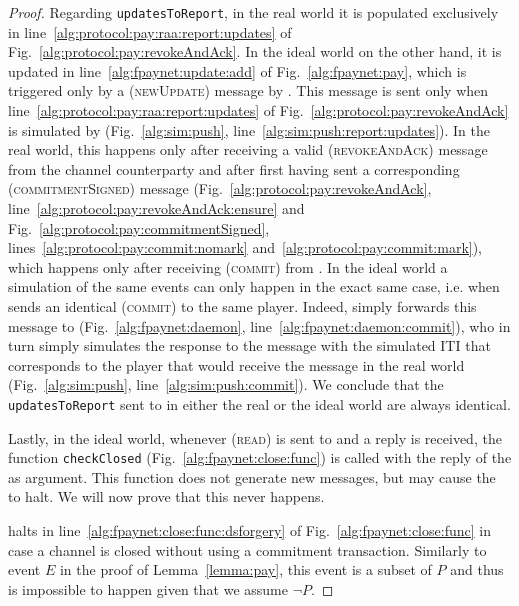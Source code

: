 \begin{proof}
  Regarding \texttt{updatesToReport}, in the real world it is populated
  exclusively in line~\ref{alg:protocol:pay:raa:report:updates} of
  Fig.~\ref{alg:protocol:pay:revokeAndAck}. In the ideal world on the other
  hand, it is updated in line~\ref{alg:fpaynet:update:add} of
  Fig.~\ref{alg:fpaynet:pay}, which is triggered only by a (\textsc{newUpdate})
  message by \simulator. This message is sent only when
  line~\ref{alg:protocol:pay:raa:report:updates} of
  Fig.~\ref{alg:protocol:pay:revokeAndAck} is simulated by \simulator{}
  (Fig.~\ref{alg:sim:push}, line~\ref{alg:sim:push:report:updates}). In the real
  world, this happens only after receiving a valid (\textsc{revokeAndAck})
  message from the channel counterparty and after first having sent a
  corresponding (\textsc{commitmentSigned}) message
  (Fig.~\ref{alg:protocol:pay:revokeAndAck},
  line~\ref{alg:protocol:pay:revokeAndAck:ensure} and
  Fig.~\ref{alg:protocol:pay:commitmentSigned},
  lines~\ref{alg:protocol:pay:commit:nomark}
  and~\ref{alg:protocol:pay:commit:mark}), which happens only after receiving
  (\textsc{commit}) from \environment. In the ideal world a simulation of the
  same events can only happen in the exact same case, i.e. when \environment{}
  sends an identical (\textsc{commit}) to the same player. Indeed, \fpaynet{}
  simply forwards this message to \simulator{} (Fig.~\ref{alg:fpaynet:daemon},
  line~\ref{alg:fpaynet:daemon:commit}), who in turn simply simulates the
  response to the message with the simulated ITI that corresponds to the player
  that would receive the message in the real world (Fig.~\ref{alg:sim:push},
  line~\ref{alg:sim:push:commit}). We conclude that the \texttt{updatesToReport}
  sent to \environment{} in either the real or the ideal world are always
  identical.

  Lastly, in the ideal world, whenever (\textsc{read}) is sent to \ledger{} and
  a reply is received, the function \texttt{checkClosed}
  (Fig.~\ref{alg:fpaynet:close:func}) is called with the reply of the \ledger{}
  as argument. This function does not generate new messages, but may cause the
  \fpaynet{} to halt. We will now prove that this never happens.

  \fpaynet{} halts in line~\ref{alg:fpaynet:close:func:dsforgery} of
  Fig.~\ref{alg:fpaynet:close:func} in case a channel is closed without using a
  commitment transaction. Similarly to event $E$ in the proof of
  Lemma~\ref{lemma:pay}, this event is a subset of $P$ and thus is impossible to
  happen given that we assume $\neg P$.


\end{proof}
